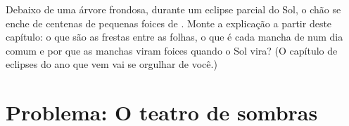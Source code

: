 \begin{exercise}[$\star\star\star$]\label{exo:g6:light-propagation:12}
Debaixo de uma árvore frondosa, durante um eclipse parcial do Sol, o
chão se enche de centenas de pequenas foices de . Monte a
explicação a partir deste capítulo: o que são as frestas entre as
folhas, o que é cada mancha de  num dia comum e por que as manchas
viram foices quando o Sol vira? (O capítulo de eclipses do ano que
vem vai se orgulhar de você.)
\end{exercise}

\section{Problema: O teatro de sombras}


